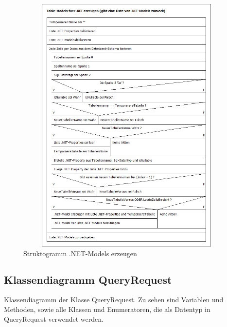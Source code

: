 \documentclass[11pt,toc=sectionentrywithoutdots, 
headheight=44pt, headings=optiontoheadandtoc, hyperfootnotes=false, hypertexnames=false]{scrartcl}
\begin{document}
 \begin{figure}[htp]
 \centering
	\includegraphics[height=500, width=430]{struktogramm.png}
	 \caption{Struktogramm .NET-Models erzeugen}
 \end{figure}
 \clearpage
 
\subsection{Klassendiagramm QueryRequest}
Klassendiagramm der Klasse QueryRequest. Zu sehen sind Variablen und Methoden, sowie alle Klassen und Enumeratoren, die als Datentyp in QueryRequest verwendet werden.
 \label{fig:Klassendiagramm}
\end{document}
